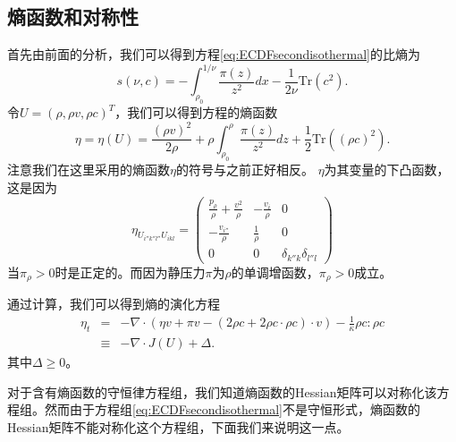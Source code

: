 \subsection{熵函数和对称性}
首先由前面的分析，我们可以得到方程\eqref{eq:ECDFsecondisothermal}的比熵为
\begin{equation*}
	s (\nu, c ) =  -\int_{\rho_0}^{1/\nu} \frac{\pi(z)}{z^2} dx - \frac{1}{2 \nu}  \mbox{Tr} (c^2).
\end{equation*}
令$U = (\rho, \rho v, \rho c)^T$，我们可以得到方程的熵函数
\begin{equation} \label{eq:cucmentropy}
	\eta = \eta(U) = \frac{(\rho v)^2}{2\rho}+\rho \int_{\rho_0}^{\rho} \frac{\pi(z)}{z^2} dz + \frac{1}{2}  \mbox{Tr} \left((\rho c)^2\right).
\end{equation}
注意我们在这里采用的熵函数$\eta$的符号与之前正好相反。%
$\eta$为其变量的下凸函数，这是因为
\begin{equation*}
	\eta_{U_{i''k''l''}U_{ikl}} = \left( \begin{array}{ccc} 
		\frac{p_\rho}{\rho} + \frac{v^2}{\rho} & -\frac{v_i}{\rho} & 0 \\
		-\frac{v_{i''}}{\rho} & \frac{1}{\rho} & 0 \\
		0 & 0 & \delta_{k''k}\delta_{l''l}
	\end{array}\right)
\end{equation*}
当$\pi_\rho>0$时是正定的。而因为静压力$\pi$为$\rho$的单调增函数，$\pi_\rho>0$成立。

通过计算，我们可以得到熵的演化方程
\begin{eqnarray}\label{23}
	\eta_t &=&  - \nabla \cdot ( \eta v+ \pi v - (2\rho c + 2 \rho c \cdot \rho c) \cdot v) - \frac{1}{\kappa} \rho c: \rho c \nonumber\\
  &\equiv& -\nabla \cdot J(U) + \Delta.	
\end{eqnarray}
其中$\Delta \ge 0$。

对于含有熵函数的守恒律方程组\cite{friedrichs1971systems}，我们知道熵函数的Hessian矩阵可以对称化该方程组。然而由于方程组\eqref{eq:ECDFsecondisothermal}不是守恒形式，熵函数的Hessian矩阵不能对称化这个方程组，下面我们来说明这一点。

